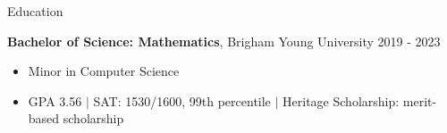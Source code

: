 \documentclass{resume} %
\begin{document}

\begin{rSection}{Education}

{\bf Bachelor of Science: Mathematics}, Brigham Young University \hfill {2019 - 2023}
\begin{itemize}
    \item Minor in Computer Science
    \item GPA 3.56 $\mid$ SAT: 1530/1600, 99th percentile $\mid$ Heritage Scholarship: merit-based scholarship
 \end{itemize}

\end{rSection}

\end{document}
